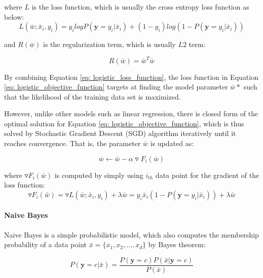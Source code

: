 where $L$ is the loss function, which is usually the cross entropy loss function as below:
\begin{equation}\label{eq: logistic_loss_function}
    L(\bar{w}; \bar{x}_i, y_i) = y_ilogP(\textbf{y}=y_i|\bar{x}_i) + (1-y_i)log(1-P(\textbf{y}=y_i|\bar{x}_i))
\end{equation}

and $R(\bar{w})$ is the regularization term, which is usually $L2$ term:

\begin{equation}
    R(\bar{w}) = \bar{w}^T\bar{w}
\end{equation}


By combining Equation \ref{eq: logistic_loss_function}, the loss function in Equation \ref{eq: logistic_objective_function} targets at finding the model parameter $\bar{w}*$ such that the likelihood of the training data set is maximized. 

However, unlike other models such as linear regression, there is closed form of the optimal solution for Equation \ref{eq: logistic_objective_function}, which is thus solved by Stochastic Gradient Descent (SGD) algorithm \cite{robert2014machine} iteratively until it reaches convergence. That is, the parameter $\bar{w}$ is updated as:

\begin{equation}
    \bar{w} \leftarrow \bar{w} - \alpha \triangledown F_i(\bar{w})
\end{equation}

where $\triangledown F_i(\bar{w})$ is computed by simply using $i_{th}$ data point for the gradient of the loss function:
\begin{equation}
    \triangledown F_i(\bar{w}) = \triangledown L(\bar{w};\bar{x}_i,y_i) + \lambda \bar{w} = y_i\bar{x}_i(1-P(\textbf{y}=y_i|\bar{x}_i)) + \lambda \bar{w}
\end{equation}

\paragraph{Naive Bayes} Naive Bayes is a simple probabilistic model, which also computes the membership probability of a data point $\bar{x} = \{x_1, x_2, \dots, x_d\}$ by Bayes theorem:

\begin{equation}\label{eq: bayes_theorem}
P(\textbf{y}=c|\bar{x}) = \frac{P(\textbf{y}=c)P(\bar{x}|\textbf{y}=c)}{P(\bar{x})}    
\end{equation}

